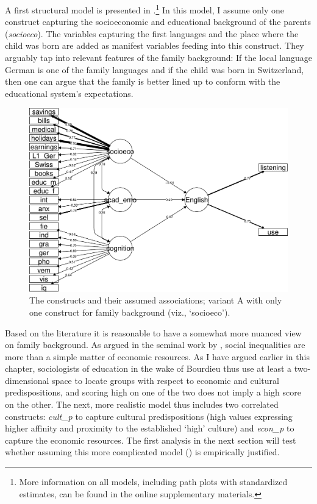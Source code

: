 \documentclass[output=paper]{langsci/langscibook}
\begin{document}
A first structural model is presented in .\footnote{More information on all models, including path plots with standardized estimates, can be found in the online supplementary materials.} In this model, I assume only one construct capturing the socioeconomic and educational background of the parents (\textit{socioeco}). The variables capturing the first languages and the place where the child was born are added as manifest variables feeding into this construct. They arguably tap into relevant features of the family background: If the local language German is one of the family languages and if the child was born in Switzerland, then one can argue that the family is better lined up to conform with the educational system’s expectations.


\begin{figure}
\includegraphics[width=\textwidth]{figures/Figure5.3.pdf}
\caption{The constructs and their assumed associations; variant A with only one construct for family background (viz., ‘socioeco’).\label{fig:05:3}}
\end{figure}

Based on the literature it is reasonable to have a somewhat more nuanced view on family background. As argued in the seminal work by \citet{Bourdieu1979}, social inequalities are more than a simple matter of economic resources. As I have argued earlier in this chapter, sociologists of education in the wake of Bourdieu thus use at least a two-dimensional space to locate groups with respect to economic and cultural predispositions, and scoring high on one of the two does not imply a high score on the other. The next, more realistic model thus includes two correlated constructs: \textit{cult\_p} to capture cultural predispositions (high values expressing higher affinity and proximity to the established ‘high’ culture) and \textit{econ\_p} to capture the economic resources. The first analysis in the next section will test whether assuming this more complicated model () is empirically justified.
\end{document}
